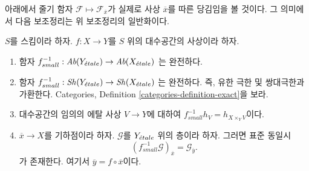 \noindent
아래에서 줄기 함자 $\mathcal{F} \mapsto \mathcal{F}_{\overline{x}}$가
실제로 사상 $\overline{x}$를 따른 당김임을 볼 것이다.
그 의미에서 다음 보조정리는 위 보조정리의 일반화이다.

\begin{lemma}
\label{lemma-stalk-pullback}
$S$를 스킴이라 하자.
$f : X \to Y$를 $S$ 위의 대수공간의 사상이라 하자.
\begin{enumerate}
\item 함자
$f_{small}^{-1} :
\textit{Ab}(Y_{\acute{e}tale})
\to
\textit{Ab}(X_{\acute{e}tale})$
는 완전하다.
\item 함자
$f_{small}^{-1} :
\mathop{\mathit{Sh}}\nolimits(Y_{\acute{e}tale})
\to
\mathop{\mathit{Sh}}\nolimits(X_{\acute{e}tale})$
는 완전하다. 즉, 유한 극한 및 쌍대극한과 가환한다.
Categories, Definition \ref{categories-definition-exact}을 보라.
\item 대수공간의 임의의 에탈 사상 $V \to Y$에 대하여
$f_{small}^{-1}h_V = h_{X \times_Y V}$이다.
\item $\overline{x} \to X$를 기하점이라 하자.
$\mathcal{G}$를 $Y_{\acute{e}tale}$ 위의 층이라 하자.
그러면 표준 동일시
$$
(f_{small}^{-1}\mathcal{G})_{\overline{x}} = \mathcal{G}_{\overline{y}}.
$$
가 존재한다. 여기서 $\overline{y} = f \circ \overline{x}$이다.
\end{enumerate}
\end{lemma}

